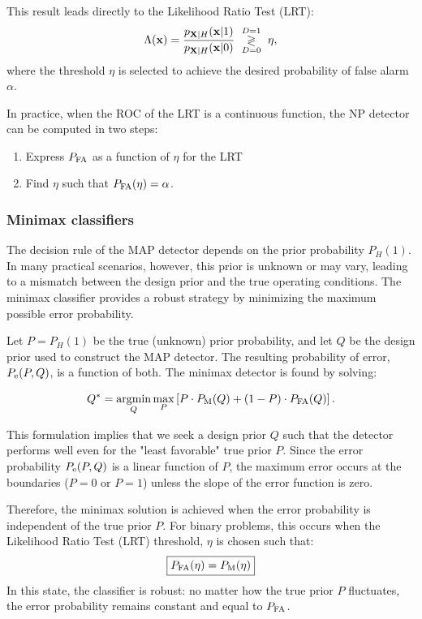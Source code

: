 This result leads directly to the Likelihood Ratio Test (LRT):
\begin{equation*}
\Lambda(\mathbf{x}) 
	= \frac{p_{{\mathbf X}|H}({\mathbf x}|1)}{p_{{\mathbf X}|H}({\mathbf x}|0)} \,\, \underset{D=0}{\overset{D=1}{\gtrless}}\,\, \eta,
\end{equation*}
where the threshold $\eta$ is selected to achieve the desired probability of false alarm $\alpha$.

In practice, when the ROC of the LRT is a continuous function, the NP detector can be computed in two steps:
\begin{enumerate}
\item Express $P_{\text{FA}}$ as a function of $\eta$ for the LRT
\item Find $\eta$ such that $P_{\text{FA}}(\eta)=\alpha$.
\end{enumerate}


\subsubsection{Minimax classifiers}

The decision rule of the MAP detector depends on the prior probability $P_H(1)$. In many practical scenarios, however, this prior is unknown or may vary, leading to a mismatch between the design prior and the true operating conditions. The minimax classifier provides a robust strategy by minimizing the maximum possible error probability.

Let $P=P_H(1)$ be the true (unknown) prior probability, and let $Q$ be the design prior used to construct the MAP detector. The resulting probability of error, $P_{\rm{e}}(P, Q)$, is a function of both. The minimax detector is found by solving:

\begin{equation}
Q^* = \operatorname*{argmin}_{Q} \max_{P} \left[P \cdot P_\text{M}(Q) + (1-P) \cdot P_\text{FA}(Q) \right].
\end{equation}

This formulation implies that we seek a design prior $Q$ such that the detector performs well even for the "least favorable" true prior $P$. Since the error probability $P_{\rm{e}}(P, Q)$ is a linear function of $P$, the maximum error occurs at the boundaries ($P=0$ or $P=1$) unless the slope of the error function is zero. 

Therefore, the minimax solution is achieved when the error probability is independent of the true prior $P$. For binary problems, this occurs when the Likelihood Ratio Test (LRT) threshold, $\eta$ is chosen such that:
\begin{align}
\boxed{
P_{\text{FA}}(\eta) = P_{\text{M}}(\eta)}
\end{align}
In this state, the classifier is robust: no matter how the true prior $P$ fluctuates, the error probability remains constant and equal to $P_{\text{FA}}$.


